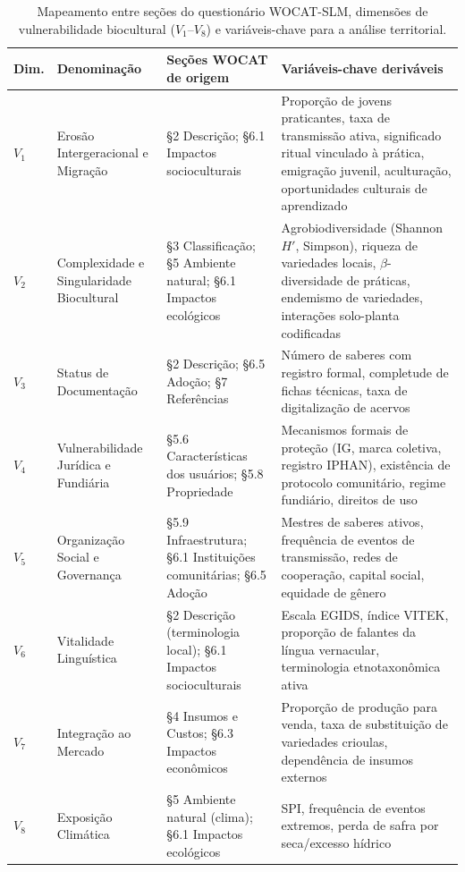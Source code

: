 \documentclass[preprint,authoryear,12pt]{elsarticle}
\begin{document}
\begin{table}[H]
\centering
\caption{Mapeamento entre seções do questionário WOCAT-SLM, dimensões de vulnerabilidade biocultural ($V_1$--$V_8$) e variáveis-chave para a análise territorial.}
\label{tab:wocat_dimensoes}
\small
\begin{tabular}{p{1cm}p{2.8cm}p{4cm}p{5cm}}
\toprule
\textbf{Dim.} & \textbf{Denominação} & \textbf{Seções WOCAT de origem} & \textbf{Variáveis-chave deriváveis} \\
\midrule
$V_1$ & Erosão Intergeracional e Migração \citep{ReyesGarcia2013evidence,GomezBaggethun2013,TangGavin2016} & §2 Descrição; §6.1 Impactos socioculturais & Proporção de jovens praticantes, taxa de transmissão ativa, significado ritual vinculado à prática, emigração juvenil, aculturação, oportunidades culturais de aprendizado \\
\addlinespace
$V_2$ & Complexidade e Singularidade Biocultural \citep{Maffi2001,Pretty2009,FernandezLlamazares2021,Zimmerer2018} & §3 Classificação; §5 Ambiente natural; §6.1 Impactos ecológicos & Agrobiodiversidade (Shannon $H'$, Simpson), riqueza de variedades locais, $\beta$-diversidade de práticas, endemismo de variedades, interações solo-planta codificadas \\
\addlinespace
$V_3$ & Status de Documentação \citep{Maina2012,Poorna2014,Balogun2021} & §2 Descrição; §6.5 Adoção; §7 Referências & Número de saberes com registro formal, completude de fichas técnicas, taxa de digitalização de acervos \\
\addlinespace
$V_4$ & Vulnerabilidade Jurídica e Fundiária \citep{Dutfield2004,Cottier2004,BavikatteRobinson2011} & §5.6 Características dos usuários; §5.8 Propriedade & Mecanismos formais de proteção (IG, marca coletiva, registro IPHAN), existência de protocolo comunitário, regime fundiário, direitos de uso \\
\addlinespace
$V_5$ & Organização Social e Governança \citep{Berkes2004,OlssonFolkeBerkes2004,Folke2004} & §5.9 Infraestrutura; §6.1 Instituições comunitárias; §6.5 Adoção & Mestres de saberes ativos, frequência de eventos de transmissão, redes de cooperação, capital social, equidade de gênero \\
\addlinespace
$V_6$ & Vitalidade Linguística \citep{Moseley2010,Zent2014} & §2 Descrição (terminologia local); §6.1 Impactos socioculturais & Escala EGIDS, índice VITEK, proporção de falantes da língua vernacular, terminologia etnotaxonômica ativa \\
\addlinespace
$V_7$ & Integração ao Mercado \citep{Bellon2004,Brush2004} & §4 Insumos e Custos; §6.3 Impactos econômicos & Proporção de produção para venda, taxa de substituição de variedades crioulas, dependência de insumos externos \\
\addlinespace
$V_8$ & Exposição Climática \citep{Altieri2015,Dossou2022} & §5 Ambiente natural (clima); §6.1 Impactos ecológicos & SPI, frequência de eventos extremos, perda de safra por seca/excesso hídrico \\
\bottomrule
\end{tabular}
\end{table}
\end{document}

